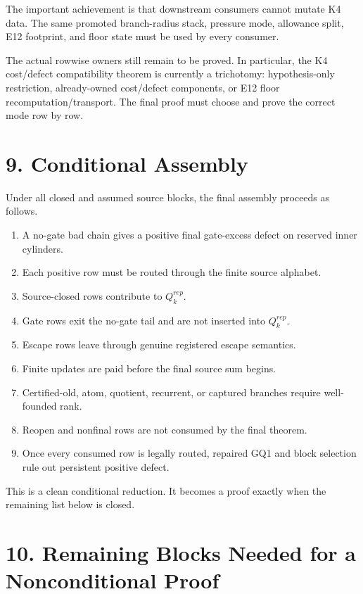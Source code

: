 \documentclass[11pt]{article}
\begin{document}
The important achievement is that downstream consumers cannot mutate K4 data. The same promoted branch-radius stack, pressure mode, allowance split, E12 footprint, and floor state must be used by every consumer.

The actual rowwise owners still remain to be proved. In particular, the K4 cost/defect compatibility theorem is currently a trichotomy: hypothesis-only restriction, already-owned cost/defect components, or E12 floor recomputation/transport. The final proof must choose and prove the correct mode row by row.

\section*{9. Conditional Assembly}

Under all closed and assumed source blocks, the final assembly proceeds as follows.

\begin{enumerate}
\item
  A no-gate bad chain gives a positive final gate-excess defect on reserved inner cylinders.
\item
  Each positive row must be routed through the finite source alphabet.
\item
  Source-closed rows contribute to \(Q_k^{rep}\).
\item
  Gate rows exit the no-gate tail and are not inserted into \(Q_k^{rep}\).
\item
  Escape rows leave through genuine registered escape semantics.
\item
  Finite updates are paid before the final source sum begins.
\item
  Certified-old, atom, quotient, recurrent, or captured branches require well-founded rank.
\item
  Reopen and nonfinal rows are not consumed by the final theorem.
\item
  Once every consumed row is legally routed, repaired GQ1 and block selection rule out persistent positive defect.
\end{enumerate}

This is a clean conditional reduction. It becomes a proof exactly when the remaining list below is closed.

\section*{10. Remaining Blocks Needed for a Nonconditional Proof}
\end{document}
